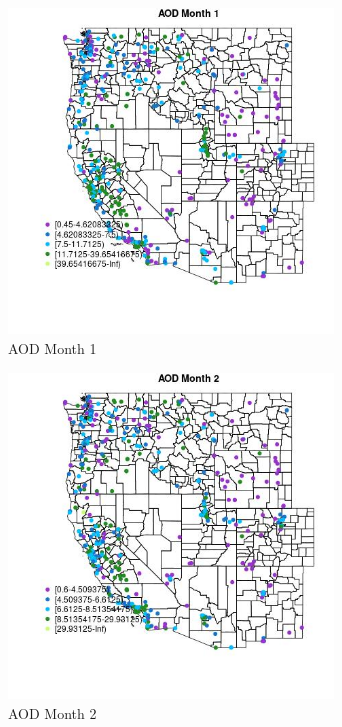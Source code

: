 \begin{figure} 
\centering  
\includegraphics[width=0.77\textwidth]{Code_Outputs/ML_input_report_ML_input_PM25_Step5_part_d_de_duplicated_aves_ML_input_MapObsMo1AOD.jpg} 
\caption{\label{fig:ML_input_report_ML_input_PM25_Step5_part_d_de_duplicated_aves_ML_inputMapObsMo1AOD}AOD Month 1} 
\end{figure} 
 

\begin{figure} 
\centering  
\includegraphics[width=0.77\textwidth]{Code_Outputs/ML_input_report_ML_input_PM25_Step5_part_d_de_duplicated_aves_ML_input_MapObsMo2AOD.jpg} 
\caption{\label{fig:ML_input_report_ML_input_PM25_Step5_part_d_de_duplicated_aves_ML_inputMapObsMo2AOD}AOD Month 2} 
\end{figure} 
 

